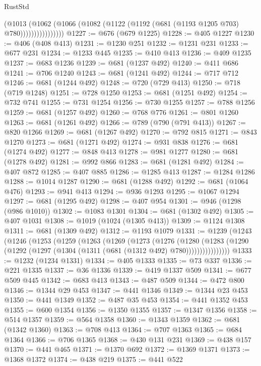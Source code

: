 \begin{lexlean}{RustStd}
\begin{coremodule}
                      (@1013
                        (@1062
                          (@1066 (@1082 (@1122 (@1192 (@681 (@1193 @1205 @703) @780))))))))))))))))
@1227 := @676 (@679 @1225)
@1228 := @405 @1227
@1230 := @406 (@408 @413)
@1231 := @1230 @251
@1232 := @1231 @231
@1233 := @677 @231
@1234 := @1233 @445
@1235 := @410 @413
@1236 := @409 @1235
@1237 := @683 @1236
@1239 := @681 (@1237 @492)
@1240 := @411 @686
@1241 := @706 @1240
@1243 := @681 (@1241 @492)
@1244 := @717 @712
@1246 := @681 (@1244 @492)
@1248 := @720 (@729 @413)
@1250 := @718 (@719 @1248)
@1251 := @728 @1250
@1253 := @681 (@1251 @492)
@1254 := @732 @741
@1255 := @731 @1254
@1256 := @730 @1255
@1257 := @788 @1256
@1259 := @681 (@1257 @492)
@1260 := @768 @776
@1261 := @801 @1260
@1263 := @681 (@1261 @492)
@1266 := @789 (@790 (@791 @413))
@1267 := @820 @1266
@1269 := @681 (@1267 @492)
@1270 := @792 @815
@1271 := @843 @1270
@1273 := @681 (@1271 @492)
@1274 := @931 @838
@1276 := @681 (@1274 @492)
@1277 := @848 @413
@1278 := @981 @1277
@1280 := @681 (@1278 @492)
@1281 := @992 @866
@1283 := @681 (@1281 @492)
@1284 := @407 @872
@1285 := @407 @885
@1286 := @1285 @413
@1287 := @1284 @1286
@1288 := @1014 @1287
@1290 := @681 (@1288 @492)
@1292 := @681 (@1064 @476)
@1293 := @941 @413
@1294 := @936 @1293
@1295 := @1067 @1294
@1297 := @681 (@1295 @492)
@1298 := @407 @954
@1301 := @946 (@1298 (@986 @1010))
@1302 := @1083 @1301
@1304 := @681 (@1302 @492)
@1305 := @407 @1031
@1308 := @1019 (@1024 (@1305 @413))
@1309 := @1124 @1308
@1311 := @681 (@1309 @492)
@1312 := @1193 @1079
@1331 := @1239
    (@1243
      (@1246
        (@1253
          (@1259
            (@1263
              (@1269
                (@1273
                  (@1276
                    (@1280
                      (@1283
                        (@1290 (@1292 (@1297 (@1304 (@1311 (@681 (@1312 @492) @780))))))))))))))))
@1333 := @1232 (@1234 @1331)
@1334 := @405 @1333
@1335 := @73 @337
@1336 := @221 @1335
@1337 := @36 @1336
@1339 := @419 @1337 @509
@1341 := @677 @509 @445
@1342 := @683 @413
@1343 := @487 @509
@1344 := @472 @800
@1346 := @1344 @29 @453
@1347 := @441 @1346
@1349 := @1344 @23 @453
@1350 := @441 @1349
@1352 := @487 @35 @453
@1354 := @441 @1352 @453
@1355 := @600 @1354
@1356 := @1350 @1355
@1357 := @1347 @1356
@1358 := @514 @1357
@1359 := @564 @1358
@1360 := @1343 @1359
@1362 := @681 (@1342 @1360)
@1363 := @708 @413
@1364 := @707 @1363
@1365 := @684 @1364
@1366 := @706 @1365
@1368 := @430 @131 @231
@1369 := @438 @157
@1370 := @441 @465
@1371 := @1370 @692
@1372 := @1369 @1371
@1373 := @1368 @1372
@1374 := @438 @219
@1375 := @441 @522

\end{coremodule}
\end{lexlean}
